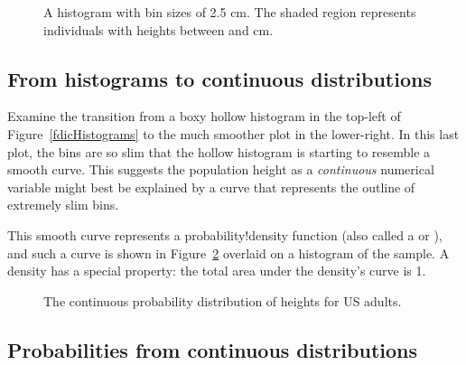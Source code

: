 \begin{figure}[h]
  \centering
  \caption{A histogram with bin sizes of 2.5 cm.
      The shaded region represents individuals with
      heights between  and  cm.}
  \label{usHeightsHist180185}
\end{figure}


\D{\newpage}

\subsection{From histograms to continuous distributions}

Examine the transition from a boxy hollow histogram in the top-left of Figure~\ref{fdicHistograms} to the much smoother plot in the lower-right. In this last plot, the bins are so slim that the hollow histogram is starting to resemble a smooth curve. This suggests the population height as a \emph{continuous} numerical variable might best be explained by a curve that represents the outline of extremely slim bins.

This smooth curve represents a
    {probability!density function}
(also called a  or ), and such a curve is shown in Figure~\ref{fdicHeightContDist} overlaid on a histogram of the sample. A density has a special property: the total area under the density's curve is 1. 

\begin{figure}[tbh]
\centering
{}
\caption{The continuous probability distribution of heights for US adults.}
\label{fdicHeightContDist}
\end{figure}



\D{\newpage}

\subsection{Probabilities from continuous distributions}

